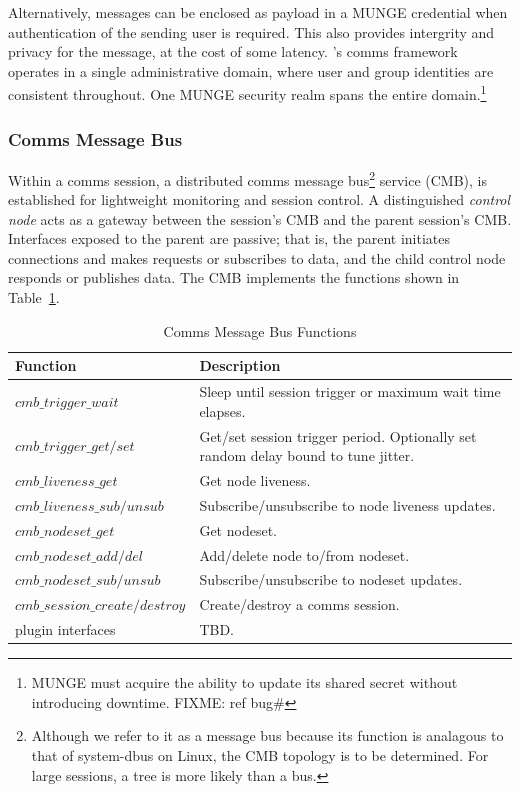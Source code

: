 Alternatively, messages can be enclosed as payload in a MUNGE\cite{MUNGE}
credential when authentication of the sending user is required.
This also provides intergrity and privacy for the message, at the cost
of some latency.
\ngrm's comms framework operates in
a single administrative domain, where user and group identities are
consistent throughout.  One MUNGE security realm spans the entire
domain.\footnote{MUNGE must acquire the ability to update its shared
secret without introducing downtime. FIXME: ref bug\#}

\subsubsection{Comms Message Bus}

Within a comms session, a distributed comms message bus\footnote{
Although we refer to it as a message bus because its function
is analagous to that of system-dbus on Linux, the CMB topology is to
be determined.  For large sessions, a tree is more likely than a bus.}
service (CMB), is established for lightweight monitoring and session control.
A distinguished {\em control node} acts as a gateway between the
session's CMB and the parent session's CMB.  Interfaces exposed to the
parent are passive; that is, the parent initiates connections and
makes requests or subscribes to data, and the child control node
responds or publishes data.  The CMB implements the functions shown
in Table~\ref{TabCMBFun}.

\begin{table}
  \centering
  \begin{tabular}{| l | p{} |}\hline
  \textbf{Function} & \textbf{Description} \\
  \hline
  $cmb\_trigger\_wait $ &
	Sleep until session trigger or maximum wait time elapses. \\
  $cmb\_trigger\_get/set$ &
	Get/set session trigger period.
	Optionally set random delay bound to tune jitter.\\
  \hline
  $cmb\_liveness\_get$ &
	Get node liveness. \\
  $cmb\_liveness\_sub/unsub$ &
	Subscribe/unsubscribe to node liveness updates. \\
  \hline
  $cmb\_nodeset\_get$ &
	Get nodeset. \\
  $cmb\_nodeset\_add/del$ &
	Add/delete node to/from nodeset. \\
  $cmb\_nodeset\_sub/unsub$ &
	Subscribe/unsubscribe to nodeset updates. \\
  \hline
  $cmb\_session\_create/destroy$ &
	Create/destroy a comms session. \\
  \hline
  plugin interfaces &
	TBD. \\
  \hline
  \end{tabular}
  \caption{Comms Message Bus Functions}
  \label{TabCMBFun}
\end{table}
%

